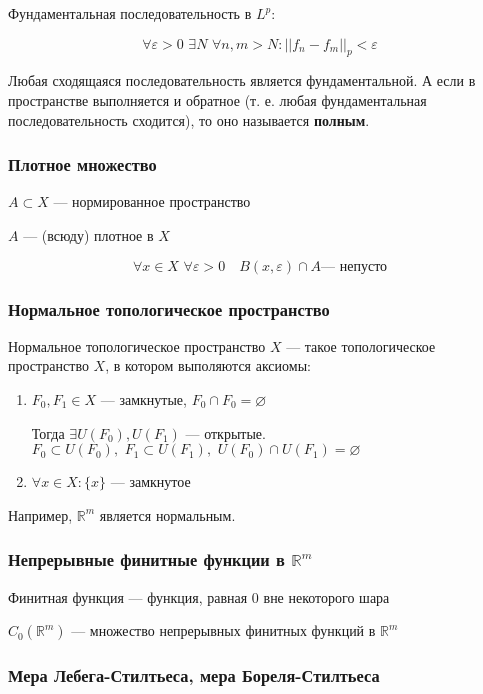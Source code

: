 \documentclass{article}
\def\dbl{\,\,}
\begin{document}
Фундаментальная последовательность в $L^p$:

\[\forall \varepsilon > 0 \dbl \exists N \dbl \forall n, m > N: ||f_n - f_m||_p < \varepsilon\]

Любая сходящаяся последовательность является фундаментальной. А если в пространстве выполняется и обратное (т. е. любая фундаментальная последовательность сходится), то оно называется \textbf{полным}.

\subsubsection{Плотное множество}

$A \subset X$ --- нормированное пространство

$A$ --- (всюду) плотное в $X$

\[\forall x \in X \dbl \forall \varepsilon > 0 \quad B(x, \varepsilon) \cap A\text{--- непусто}\]

\subsubsection{Нормальное топологическое пространство}

Нормальное топологическое пространство $X$ --- такое топологическое пространство $X$, в котором выполяются аксиомы:

\begin{enumerate}
    \item $F_0, F_1 \in X$ --- замкнутые, $F_0 \cap F_0 = \varnothing$
    
    Тогда $\exists U(F_0), U(F_1)$ --- открытые. $F_0 \subset U(F_0), \dbl F_1 \subset U(F_1), \dbl U(F_0) \cap U(F_1) = \varnothing$

    \item $\forall x \in X: \{x\}$ --- замкнутое
\end{enumerate}

Например, $\mathbb{R}^m$ является нормальным.

\subsubsection{Непрерывные финитные функции в $\mathbb{R}^m$}

Финитная функция --- функция, равная 0 вне некоторого шара

$C_0(\mathbb{R}^m)$ --- множество непрерывных финитных функций в $\mathbb{R}^m$

\subsubsection{Мера Лебега-Стилтьеса, мера Бореля-Стилтьеса}
\end{document}
